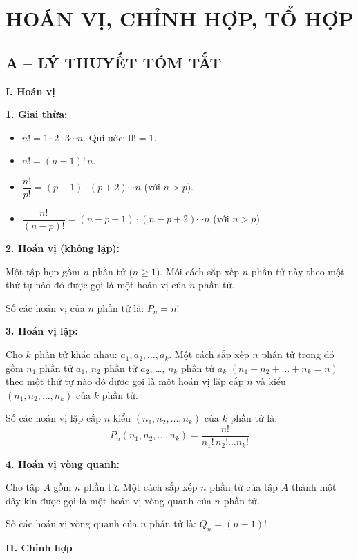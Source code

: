 \section*{HOÁN VỊ, CHỈNH HỢP, TỔ HỢP}
\subsection*{A -- LÝ THUYẾT TÓM TẮT}

\textbf{I. Hoán vị}

\textbf{1. Giai thừa:}
\begin{itemize}
	\item $n!=1\cdot2\cdot3\cdots n$. Qui ước: $0!=1$.
	\item $n!=(n-1)!\,n$.
	\item $\dfrac{n!}{p!}=(p+1)\cdot(p+2)\cdots n$ (với $n>p$).
	\item $\dfrac{n!}{(n-p)!}=(n-p+1)\cdot(n-p+2)\cdots n$ (với $n>p$).
\end{itemize}

\textbf{2. Hoán vị (không lặp):}

Một tập hợp gồm $n$ phần tử ($n\ge 1$). Mỗi cách sắp xếp $n$ phần tử này theo một thứ tự nào đó được gọi là một hoán vị của $n$ phần tử.

Số các hoán vị của $n$ phần tử là: $P_n=n!$

\textbf{3. Hoán vị lặp:}

Cho $k$ phần tử khác nhau: $a_1,a_2,\ldots,a_k$. Một cách sắp xếp $n$ phần tử trong đó gồm $n_1$ phần tử $a_1$, $n_2$ phần tử $a_2$, \ldots, $n_k$ phần tử $a_k$ $(n_1+n_2+\ldots+n_k=n)$ theo một thứ tự nào đó được gọi là một hoán vị lặp cấp $n$ và kiểu $(n_1,n_2,\ldots,n_k)$ của $k$ phần tử.

Số các hoán vị lặp cấp $n$ kiểu $(n_1,n_2,\ldots,n_k)$ của $k$ phần tử là:
\[P_n(n_1,n_2,\ldots,n_k)=\dfrac{n!}{n_1!\,n_2!\ldots n_k!}\]

\textbf{4. Hoán vị vòng quanh:}

Cho tập $A$ gồm $n$ phần tử. Một cách sắp xếp $n$ phần tử của tập $A$ thành một dãy kín được gọi là một hoán vị vòng quanh của $n$ phần tử.

Số các hoán vị vòng quanh của $n$ phần tử là: $Q_n=(n-1)!$

\textbf{II. Chỉnh hợp}

